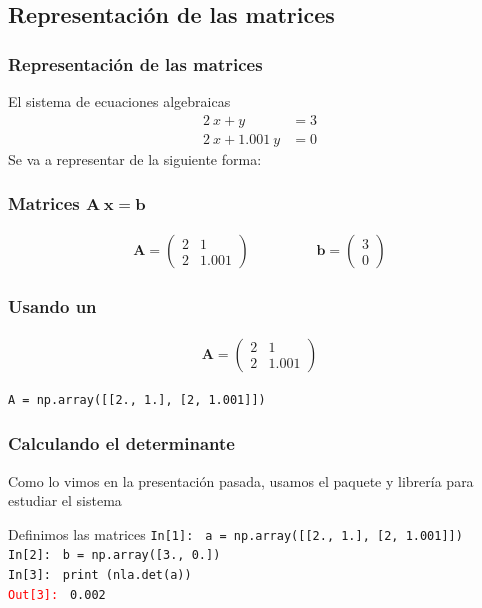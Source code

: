 \subsection*{Representación de las matrices}
\begin{frame}
\frametitle{Representación de las matrices}
El sistema de ecuaciones algebraicas
\begin{align*}
2 \: x + y &= 3 \\
2 \: x + 1.001 \:y &= 0
\end{align*}
Se va a representar de la siguiente forma:
\end{frame}
\begin{frame}
\frametitle{Matrices $\mathbf{A \: x =  b}$}
\begin{align*}
\mathbf{A} = \begin{pmatrix}
2 & 1 \\
2 & 1.001
\end{pmatrix}
\hspace{2cm}
\mathbf{b} = \begin{pmatrix}
3 \\
0
\end{pmatrix}
\end{align*}
\end{frame}
\begin{frame}[fragile]
\frametitle{Usando un }    
\begin{align*}
\mathbf{A} = \begin{pmatrix}
2 & 1 \\
2 & 1.001
\end{pmatrix}
\end{align*}
\vspace{1cm}
\begin{verbatim}
A = np.array([[2., 1.], [2, 1.001]])
\end{verbatim}
\end{frame}
\begin{frame}[fragile]
\frametitle{Calculando el determinante}
Como lo vimos en la presentación pasada, usamos el paquete y librería  para estudiar el sistema
\begin{exampleblock}{Definimos las matrices}
\textcolor{ao}{\texttt{In[1]: }} \texttt{a = np.array([[2., 1.], [2, 1.001]])} \\
\medskip
\pause
\textcolor{ao}{\texttt{In[2]: }} \texttt{b = np.array([3., 0.])} \\
\medskip
\pause
\textcolor{ao}{\texttt{In[3]: }} \texttt{print (nla.det(a))} \\
\medskip
\pause
\textcolor{red}{\texttt{Out[3]: }} \texttt{0.002}
\end{exampleblock}
\end{frame}
